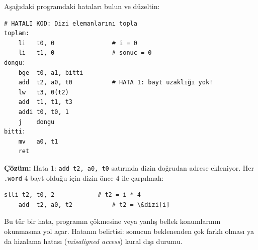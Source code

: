 \begin{ornek}[4.23]
\label{orn:hata-ornek}
Aşağıdaki programdaki hataları bulun ve düzeltin:

\begin{lstlisting}[style=riscv]
# HATALI KOD: Dizi elemanlarını topla
toplam:
    li   t0, 0                # i = 0
    li   t1, 0                # sonuc = 0
dongu:
    bge  t0, a1, bitti
    add  t2, a0, t0           # HATA 1: bayt uzaklığı yok!
    lw   t3, 0(t2)
    add  t1, t1, t3
    addi t0, t0, 1
    j    dongu
bitti:
    mv   a0, t1
    ret
\end{lstlisting}

\textbf{Çözüm:} Hata 1: \texttt{add t2, a0, t0} satırında dizin doğrudan adrese ekleniyor. Her \texttt{.word} 4 bayt olduğu için dizin önce 4 ile çarpılmalı:

\begin{lstlisting}[style=riscv]
    slli t2, t0, 2            # t2 = i * 4
    add  t2, a0, t2           # t2 = \&dizi[i]
\end{lstlisting}

Bu tür bir hata, programın çökmesine veya yanlış bellek konumlarının okunmasına yol açar. Hatanın belirtisi: sonucun beklenenden çok farklı olması ya da hizalama hatası (\emph{misaligned access}) kural dışı durumu.
\end{ornek}

